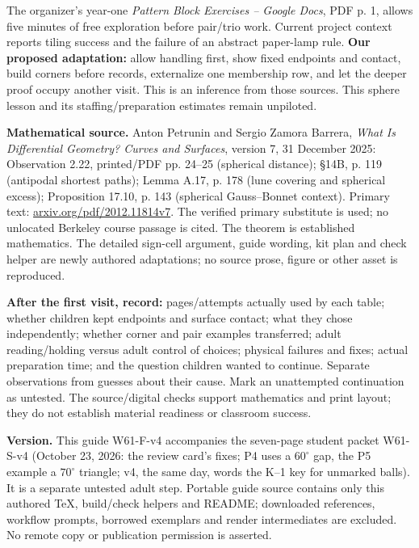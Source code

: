 \documentclass[11pt,letterpaper]{article}
\newcommand{\degc}{^\circ}
\begin{document}
The organizer's year-one \emph{Pattern Block Exercises -- Google Docs}, PDF p. 1, allows five minutes of free exploration before pair/trio work. Current project context reports tiling success and the failure of an abstract paper-lamp rule. \textbf{Our proposed adaptation:} allow handling first, show fixed endpoints and contact, build corners before records, externalize one membership row, and let the deeper proof occupy another visit. This is an inference from those sources. This sphere lesson and its staffing/preparation estimates remain unpiloted.

\textbf{Mathematical source.} Anton Petrunin and Sergio Zamora Barrera, \emph{What Is Differential Geometry? Curves and Surfaces}, version 7, 31 December 2025: Observation 2.22, printed/PDF pp. 24--25 (spherical distance); \S14B, p. 119 (antipodal shortest paths); Lemma A.17, p. 178 (lune covering and spherical excess); Proposition 17.10, p. 143 (spherical Gauss--Bonnet context). Primary text: \href{https://arxiv.org/pdf/2012.11814v7}{arxiv.org/pdf/2012.11814v7}. The verified primary substitute is used; no unlocated Berkeley course passage is cited. The theorem is established mathematics. The detailed sign-cell argument, guide wording, kit plan and check helper are newly authored adaptations; no source prose, figure or other asset is reproduced.

\textbf{After the first visit, record:} pages/attempts actually used by each table; whether children kept endpoints and surface contact; what they chose independently; whether corner and pair examples transferred; adult reading/holding versus adult control of choices; physical failures and fixes; actual preparation time; and the question children wanted to continue. Separate observations from guesses about their cause. Mark an unattempted continuation as untested. The source/digital checks support mathematics and print layout; they do not establish material readiness or classroom success.

\textbf{Version.} This guide W61-F-v4 accompanies the seven-page student packet W61-S-v4 (October 23, 2026: the review card's fixes; P4 uses a $60\degc$ gap, the P5 example a $70\degc$ triangle; v4, the same day, words the K--1 key for unmarked balls). It is a separate untested adult step. Portable guide source contains only this authored TeX, build/check helpers and README; downloaded references, workflow prompts, borrowed exemplars and render intermediates are excluded. No remote copy or publication permission is asserted.
\end{document}
